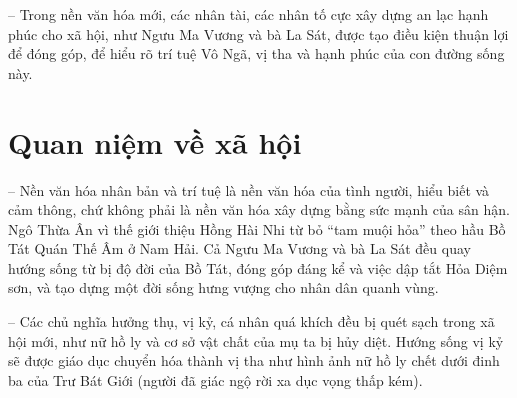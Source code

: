 -- Trong nền văn hóa mới, các nhân tài, các nhân tố cực xây dựng an lạc hạnh phúc cho xã hội, như Ngưu Ma Vương và bà La Sát, được tạo điều kiện thuận lợi để đóng góp, để hiểu rõ trí tuệ Vô Ngã, vị tha và hạnh phúc của con đường sống này.

\section{Quan niệm về xã hội} %
\label{sec:59_60_xa_hoi}

-- Nền văn hóa nhân bản và trí tuệ là nền văn hóa của tình người, hiểu biết và cảm thông, chứ không phải là nền văn hóa xây dựng bằng sức mạnh của sân hận. Ngô Thừa Ân vì thế giới thiệu Hồng Hài Nhi từ bỏ ``tam muội hỏa'' theo hầu Bồ Tát Quán Thế Âm ở Nam Hải. Cả Ngưu Ma Vương và bà La Sát đều quay hướng sống từ bị độ đời của Bồ Tát, đóng góp đáng kể và việc dập tắt Hỏa Diệm sơn, và tạo dựng một đời sống hưng vượng cho nhân dân quanh vùng.

-- Các chủ nghĩa hưởng thụ, vị kỷ, cá nhân quá khích đều bị quét sạch trong xã hội mới, như nữ hồ ly và cơ sở vật chất của mụ ta bị hủy diệt. Hướng sống vị kỷ sẽ được giáo dục chuyển hóa thành vị tha như hình ảnh nữ hồ ly chết dưới đinh ba của Trư Bát Giới (người đã giác ngộ rời xa dục vọng thấp kém).
